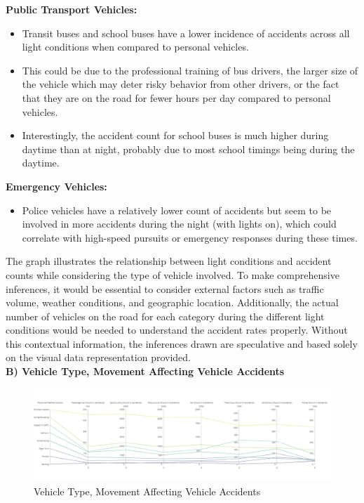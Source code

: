 \documentclass[conference]{IEEEtran}
\begin{document}
\begin{enumerate}
\textbf{Public Transport Vehicles:}
\begin{itemize}
    \item Transit buses and school buses have a lower incidence of accidents across all light conditions when compared to personal vehicles.
    \item This could be due to the professional training of bus drivers, the larger size of the vehicle which may deter risky behavior from other drivers, or the fact that they are on the road for fewer hours per day compared to personal vehicles.
    \item Interestingly, the accident count for school buses is much higher during daytime than at night, probably due to most school timings being during the daytime.
\end{itemize}

\textbf{Emergency Vehicles:}
\begin{itemize}
    \item Police vehicles have a relatively lower count of accidents but seem to be involved in more accidents during the night (with lights on), which could correlate with high-speed pursuits or emergency responses during these times.
\end{itemize}

The graph illustrates the relationship between light conditions and accident counts while considering the type of vehicle involved. To make comprehensive inferences, it would be essential to consider external factors such as traffic volume, weather conditions, and geographic location. Additionally, the actual number of vehicles on the road for each category during the different light conditions would be needed to understand the accident rates properly. Without this contextual information, the inferences drawn are speculative and based solely on the visual data representation provided.\\

\textbf{B) Vehicle Type, Movement Affecting Vehicle Accidents}


\begin{figure}
    \centering
    \includegraphics[width=1\linewidth]{newplot (2).png}
    \caption{Vehicle Type, Movement Affecting Vehicle Accidents}
    

\end{figure}
\end{enumerate}
\end{document}
